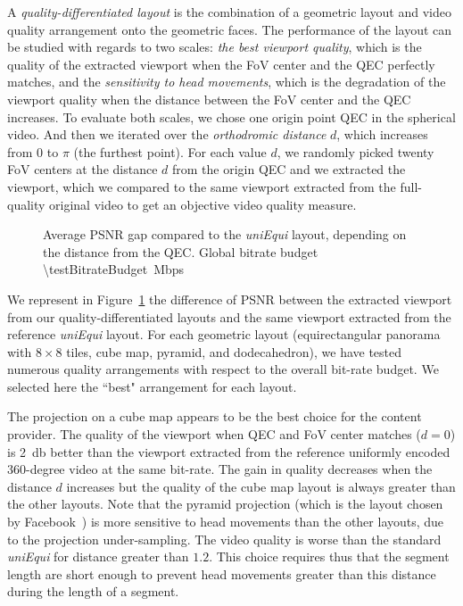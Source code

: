 
A \textit{quality-differentiated layout} is the combination of a geometric layout and video quality
arrangement onto the geometric faces. The performance of the layout can be studied with
regards to two scales: \emph{the best viewport quality}, which is the quality of the extracted viewport
when the FoV center and the QEC perfectly matches, and the \emph{sensitivity to head movements},
which is the degradation of the viewport quality when the distance between the FoV center
and the QEC increases.
To evaluate both scales, we chose one origin point \ac{QEC} in the spherical video. And then we iterated
over the \emph{orthodromic distance} $d$, which increases from $0$ to $\pi$ (the furthest point). For each
value $d$, we randomly picked twenty \ac{FoV} centers at the distance $d$ from the origin \ac{QEC}
and we extracted the viewport, which we compared to the same viewport extracted from the
full-quality original video to get an objective video quality measure.

\begin{figure}
    
    \caption{Average \acs{PSNR} gap compared to the \emph{uniEqui} layout, depending on the distance from the \acs{QEC}. Global bitrate budget \SI{\testBitrateBudget}{\mega bps}}
    \label{fig:dist_quality_psnr}
\end{figure}

We represent in Figure~\ref{fig:dist_quality_psnr} the difference of \ac{PSNR} between
the extracted viewport from our quality-differentiated layouts and the same viewport extracted from
the reference \textit{uniEqui} layout. For each geometric layout (equirectangular
panorama with $8\times 8$ tiles, cube map, pyramid, and dodecahedron), we have tested
numerous quality arrangements with respect to the overall bit-rate budget. We selected
here the ``best" arrangement for each layout.

The projection on a cube map appears to be the best choice for the content provider. The quality of
the viewport when QEC and FoV center matches ($d=0$) is \SI{2}{\decibel} better than the viewport extracted
from the reference uniformly encoded 360-degree video at the same bit-rate. The gain in quality
decreases when the distance $d$ increases but the quality of the cube map layout is always greater
than the other layouts. Note that the pyramid projection (which is the layout chosen
by Facebook~\cite{facebook}) is more sensitive to head movements than
the other layouts, due to the projection under-sampling. The video quality is worse than
the standard \emph{uniEqui} for distance greater than $1.2$. This choice requires thus
that the segment length are short enough to prevent head movements greater than this
distance during the length of a segment.

